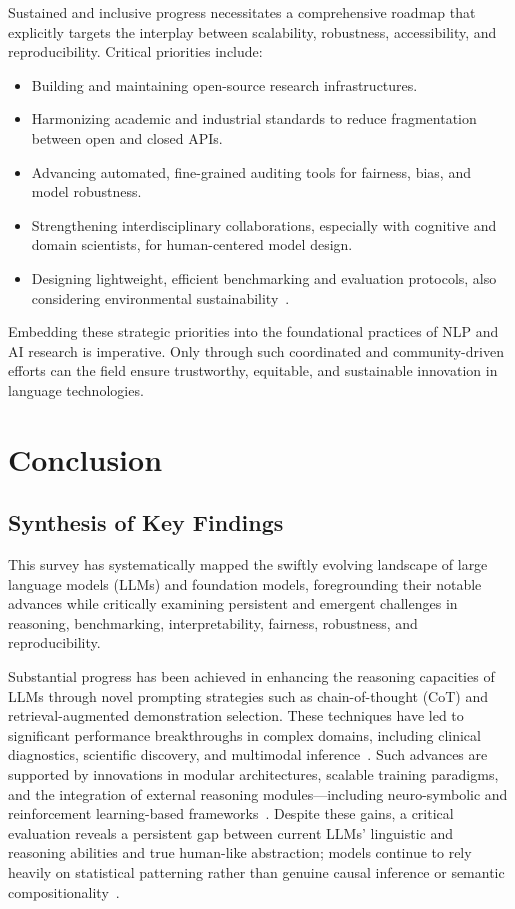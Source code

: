 Sustained and inclusive progress necessitates a comprehensive roadmap that explicitly targets the interplay between scalability, robustness, accessibility, and reproducibility. Critical priorities include:

\begin{itemize}
    \item Building and maintaining open-source research infrastructures.
    \item Harmonizing academic and industrial standards to reduce fragmentation between open and closed APIs.
    \item Advancing automated, fine-grained auditing tools for fairness, bias, and model robustness.
    \item Strengthening interdisciplinary collaborations, especially with cognitive and domain scientists, for human-centered model design.
    \item Designing lightweight, efficient benchmarking and evaluation protocols, also considering environmental sustainability~\cite{ref13,ref34,ref46,ref47,ref55,ref66,ref68,ref70,ref71,ref88,ref101,ref104,ref106,ref107,ref108}.
\end{itemize}

Embedding these strategic priorities into the foundational practices of NLP and AI research is imperative. Only through such coordinated and community-driven efforts can the field ensure trustworthy, equitable, and sustainable innovation in language technologies.

\section{Conclusion}

\subsection{Synthesis of Key Findings}

This survey has systematically mapped the swiftly evolving landscape of large language models (LLMs) and foundation models, foregrounding their notable advances while critically examining persistent and emergent challenges in reasoning, benchmarking, interpretability, fairness, robustness, and reproducibility.

Substantial progress has been achieved in enhancing the reasoning capacities of LLMs through novel prompting strategies such as chain-of-thought (CoT) and retrieval-augmented demonstration selection. These techniques have led to significant performance breakthroughs in complex domains, including clinical diagnostics, scientific discovery, and multimodal inference~\cite{ref23,ref38,ref47,ref58,ref61,ref78,ref86}. Such advances are supported by innovations in modular architectures, scalable training paradigms, and the integration of external reasoning modules—including neuro-symbolic and reinforcement learning-based frameworks~\cite{ref49,ref52,ref57,ref86,ref87,ref89}. Despite these gains, a critical evaluation reveals a persistent gap between current LLMs' linguistic and reasoning abilities and true human-like abstraction; models continue to rely heavily on statistical patterning rather than genuine causal inference or semantic compositionality~\cite{ref23,ref49,ref57}.

